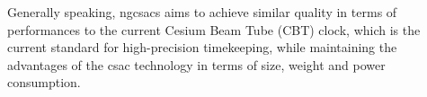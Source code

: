 Generally speaking, \acrshort{ngcsacs} aims to achieve similar quality in terms of performances to the current Cesium Beam Tube (CBT) clock, which is the current standard for high-precision timekeeping, while maintaining the advantages of the \acrshort{csac} technology in terms of size, weight and power consumption.

